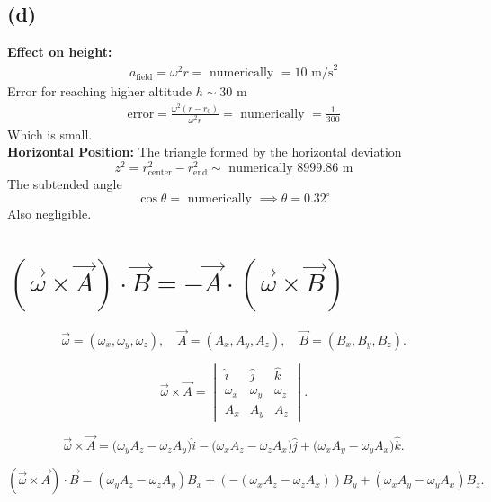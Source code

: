 \documentclass[letter, 10pts]{article}
\begin{document}
\subsection*{(d)} 
\textbf{Effect on height: }
\begin{align*}
a_\text{field}  = \omega^2 r = \text{ numerically } = 10 \text{ m/s}^2
\end{align*}
Error for reaching higher altitude $h \sim 30 \text{ m}$ 
\begin{align*}
\text{error} = 
\frac{
\omega^2 (r - r_0)
}{\omega^2 r} = \text{ numerically } = \frac{1}{300}
\end{align*}
Which is small. \\
\textbf{Horizontal Position:} 
The triangle formed by the horizontal deviation 
\[
z^2 = r_\text{center}^2 - r_\text{end}^2 \sim \text{ numerically } 8999.86 \text{ m}
\] 
The subtended angle 
\[
\cos \theta = \text{ numerically } \implies \theta = 0.32^{\circ}
\] 	
Also negligible. 




















\newpage
\section*{\((\vec{\omega} \times \vec{A}) \cdot \vec{B} = -\vec{A} \cdot (\vec{\omega} \times \vec{B})\)}

\[
\vec{\omega} = (\omega_x, \omega_y, \omega_z), \quad \vec{A} = (A_x, A_y, A_z), \quad \vec{B} = (B_x, B_y, B_z).
\]

\[
\vec{\omega} \times \vec{A} = 
\begin{vmatrix}
\hat{i} & \hat{j} & \hat{k} \\
\omega_x & \omega_y & \omega_z \\
A_x & A_y & A_z
\end{vmatrix}.
\]

\[
\vec{\omega} \times \vec{A} = \big( \omega_y A_z - \omega_z A_y \big)\hat{i} - \big( \omega_x A_z - \omega_z A_x \big)\hat{j} + \big( \omega_x A_y - \omega_y A_x \big)\hat{k}.
\]


\[
(\vec{\omega} \times \vec{A}) \cdot \vec{B} = (\omega_y A_z - \omega_z A_y)B_x + (-(\omega_x A_z - \omega_z A_x))B_y + (\omega_x A_y - \omega_y A_x)B_z.
\]
\end{document}
